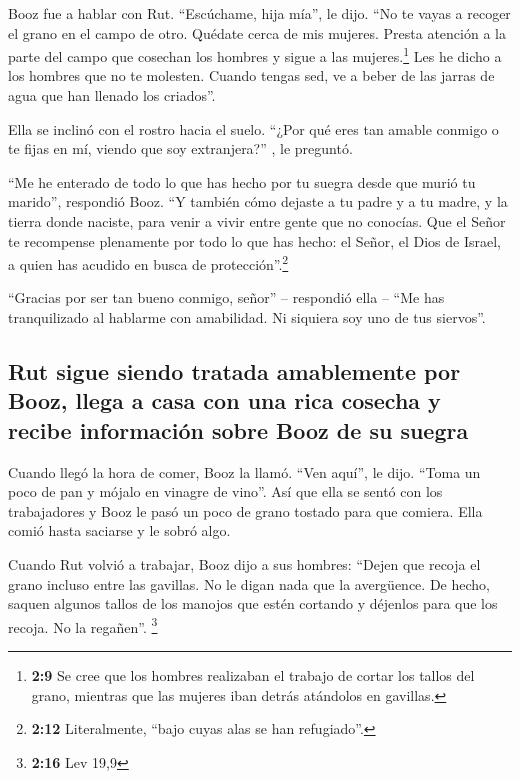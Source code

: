  Booz fue a hablar con Rut. ``Escúchame, hija mía'', le
dijo. ``No te vayas a recoger el grano en el campo de otro. Quédate
cerca de mis mujeres.  Presta atención a la parte del
campo que cosechan los hombres y sigue a las mujeres.\footnote{\textbf{2:9}
  Se cree que los hombres realizaban el trabajo de cortar los tallos del
  grano, mientras que las mujeres iban detrás atándolos en gavillas.}
Les he dicho a los hombres que no te molesten. Cuando tengas sed, ve a
beber de las jarras de agua que han llenado los criados''.

 Ella se inclinó con el rostro hacia el suelo. ``¿Por qué
eres tan amable conmigo o te fijas en mí, viendo que soy extranjera?'' ,
le preguntó.

 ``Me he enterado de todo lo que has hecho por tu suegra
desde que murió tu marido'', respondió Booz. ``Y también cómo dejaste a
tu padre y a tu madre, y la tierra donde naciste, para venir a vivir
entre gente que no conocías.  Que el Señor te recompense
plenamente por todo lo que has hecho: el Señor, el Dios de Israel, a
quien has acudido en busca de protección''.\footnote{\textbf{2:12}
  Literalmente, ``bajo cuyas alas se han refugiado''.}

 ``Gracias por ser tan bueno conmigo, señor'' --
respondió ella -- ``Me has tranquilizado al hablarme con amabilidad. Ni
siquiera soy uno de tus siervos''.

\hypertarget{rut-sigue-siendo-tratada-amablemente-por-booz-llega-a-casa-con-una-rica-cosecha-y-recibe-informaciuxf3n-sobre-booz-de-su-suegra}{%
\subsection{Rut sigue siendo tratada amablemente por Booz, llega a casa
con una rica cosecha y recibe información sobre Booz de su
suegra}\label{rut-sigue-siendo-tratada-amablemente-por-booz-llega-a-casa-con-una-rica-cosecha-y-recibe-informaciuxf3n-sobre-booz-de-su-suegra}}

 Cuando llegó la hora de comer, Booz la llamó. ``Ven
aquí'', le dijo. ``Toma un poco de pan y mójalo en vinagre de vino''.
Así que ella se sentó con los trabajadores y Booz le pasó un poco de
grano tostado para que comiera. Ella comió hasta saciarse y le sobró
algo.

 Cuando Rut volvió a trabajar, Booz dijo a sus hombres:
``Dejen que recoja el grano incluso entre las gavillas. No le digan nada
que la avergüence.  De hecho, saquen algunos tallos de
los manojos que estén cortando y déjenlos para que los recoja. No la
regañen''. \footnote{\textbf{2:16} Lev 19,9}

